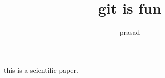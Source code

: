 \documentclass[10pt]{article}
\author{prasad}
\title{git is fun}
\begin{document}
	\maketitle
	
	this is a scientific paper.
\end{document}
